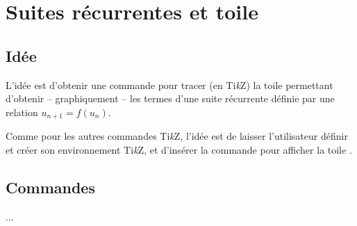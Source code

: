 \documentclass[a4paper,french,11pt]{article}
\providecommand\tikzlogo{Ti\textit{k}Z}
\let\TikZ\tikzlogo
\newcommand\ctex[1]{\tcbox[vignettelatex]{#1}}
\begin{document}
\begin{codesortie}
\begin{center}
\end{center}
\end{codesortie}

\newpage

\section{Suites récurrentes et \og toile \fg}\label{recurr}

\subsection{Idée}

\begin{codeidee}
L'idée est d'obtenir une commande pour tracer (en \TikZ) la \og toile \fg{} permettant d'obtenir -- graphiquement -- les termes d'une suite récurrente définie par une relation $u_{n+1}=f(u_n)$.

\smallskip

Comme pour les autres commandes \TikZ, l'idée est de laisser l'utilisateur définir et créer son environnement \TikZ, et d'insérer la commande \ctex{ToileRecurrence} pour afficher la \og toile \fg.
\end{codeidee}

\subsection{Commandes}

\begin{codetex}
...
\end{codetex}
\end{document}
